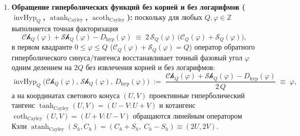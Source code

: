 \begin{theorem}
\begin{enumerate}[label=\textbf{(\arabic*)},leftmargin=*]
\begin{equation}
    \mathcal{Ch}_Q(\varphi) \;:=\; \mathcal{C}_Q(\varphi)^2 + \mathcal{S}_Q(\varphi)^2, \qquad
    \mathcal{Sh}_Q(\varphi) \;:=\; 2\,\mathcal{C}_Q(\varphi)\,\mathcal{S}_Q(\varphi), \qquad
    D_{\mathrm{hyp}}(\varphi) \;:=\; \mathcal{C}_Q(\varphi)^2 - \mathcal{S}_Q(\varphi)^2,
  \end{equation}
  которые тождественно лежат на гиперболе Минковского и сохраняют сумму светового конуса по всему кольцу $\mathbb{Z}_{4Q}$:
  \begin{align}
    \mathcal{Ch}_Q(\varphi)^2 - \mathcal{Sh}_Q(\varphi)^2 &\equiv D_{\mathrm{hyp}}(\varphi)^2, \label{eq:math-minkowski-hyperbola-id} \\
    \mathcal{Ch}_Q(\varphi) + \bigl|\mathcal{Sh}_Q(\varphi)\bigr| &\equiv \bigl(|\mathcal{C}_Q(\varphi)| + |\mathcal{S}_Q(\varphi)|\bigr)^2 \;\equiv\; Q^2. \label{eq:math-hyperbolic-lightcone-const}
  \end{align}
\item \textbf{Обращение гиперболических функций без корней и без логарифмов ($\operatorname{invHyp}_Q$, $\operatorname{atanh}_{\mathrm{Cayley}}$, $\operatorname{acoth}_{\mathrm{Cayley}}$):}
  поскольку для любых $Q, \varphi \in \mathbb{Z}$ выполняется точная факторизация
  \begin{equation}
    \label{eq:math-invhyp-factorization}
    \mathcal{Ch}_Q(\varphi) + \mathcal{Sh}_Q(\varphi) - D_{\mathrm{hyp}}(\varphi) \;\equiv\; 2\,\mathcal{S}_Q(\varphi)\,\bigl(\mathcal{C}_Q(\varphi) + \mathcal{S}_Q(\varphi)\bigr),
  \end{equation}
  в первом квадранте $0 \le \varphi \le Q$ ($\mathcal{C}_Q(\varphi) + \mathcal{S}_Q(\varphi) = Q$) оператор обратного гиперболического синуса/тангенса восстанавливает точный фазовый угол $\varphi$ одним делением на $2Q$ без извлечения корней и без логарифмов:
  \begin{equation}
    \label{eq:math-invhyp-exact}
    \operatorname{invHyp}_Q\bigl(\mathcal{Ch}_Q(\varphi),\, \mathcal{Sh}_Q(\varphi),\, D_{\mathrm{hyp}}(\varphi)\bigr) \;:=\; \frac{\mathcal{Ch}_Q(\varphi) + \mathcal{Sh}_Q(\varphi) - D_{\mathrm{hyp}}(\varphi)}{2\,Q} \;\equiv\; \varphi,
  \end{equation}
  а на координатах светового конуса $(U, V)$ проективные гиперболический тангенс $\tanh_{\mathrm{Cayley}}(U, V) = (U - V : U + V)$ и котангенс $\coth_{\mathrm{Cayley}}(U, V) = (U + V : U - V)$ обращаются линейным оператором Кэли $\operatorname{atanh}_{\mathrm{Cayley}}(S_h, C_h) = (C_h + S_h,\ C_h - S_h) \equiv (2U, 2V)$.
\end{enumerate}
\end{theorem}

